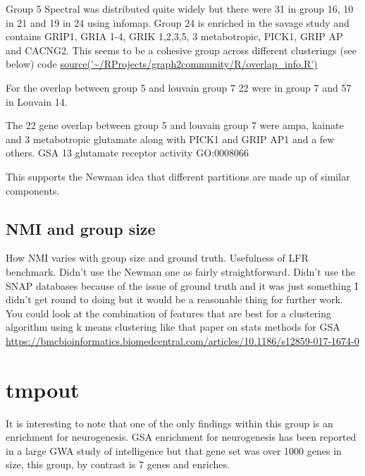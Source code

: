 Group 5 Spectral was distributed quite widely but there were 31 in group 16, 10 in 21 and 19 in 24 using infomap. Group 24 is enriched in the savage study and contains GRIP1, GRIA 1-4, GRIK 1,2,3,5, 3 metabotropic, PICK1, GRIP AP and CACNG2. This seems to be a cohesive group across different clusterings (see below) code \url{source('~/RProjects/graph2community/R/overlap_info.R')}


For the overlap between group 5 
and louvain group 7 22 were in group 7 and 57 in Louvain 14.

The 22 gene overlap between group 5 and louvain group 7 were ampa, kainate and 3 metabotropic glutamate along with PICK1 and GRIP AP1 and a few others. GSA 13 glutamate receptor activity GO:0008066 

This supports the Newman idea that different partitions are made up of similar components. 



\subsection{NMI and group size}
 How NMI varies with group size and ground truth. Usefulness of LFR benchmark. Didn't use the Newman one as fairly straightforward. Didn't use the SNAP databases because of the issue of ground truth and it was just something I didn't get round to doing but it would be a reasonable thing for further work. 
 You could look at the combination of features that are best for a clustering algorithm using k means clustering like that paper on stats methods for GSA \url{https://bmcbioinformatics.biomedcentral.com/articles/10.1186/s12859-017-1674-0}
 
 

\section{tmpout}

 It is interesting to note that one of the only findings within this group is an enrichment for neurogenesis. GSA enrichment for neurogenesis has been reported in a large GWA study of intelligence\cite{hill2019combined} but that gene set was over 1000 genes in size, this group, by contrast is 7 genes and enriches. 




